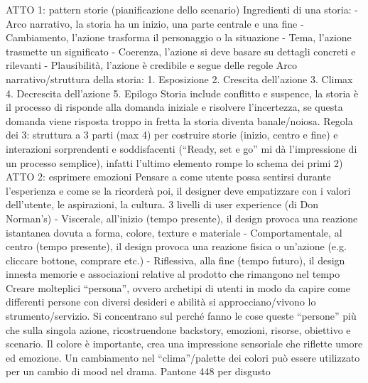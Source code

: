 ATTO 1: pattern storie (pianificazione dello scenario)
Ingredienti di una storia:
-	Arco narrativo, la storia ha un inizio, una parte centrale e una fine
-	Cambiamento, l'azione trasforma il personaggio o la situazione
-	Tema, l'azione trasmette un significato
-	Coerenza, l'azione si deve basare su dettagli concreti e rilevanti
-	Plausibilità, l'azione è credibile e segue delle regole 
Arco narrativo/struttura della storia:
1.	Esposizione
2.	Crescita dell'azione
3.	Climax
4.	Decrescita dell'azione
5.	Epilogo
Storia include conflitto e suspence, la storia è il processo di risponde alla domanda iniziale e risolvere l'incertezza, se questa domanda viene risposta troppo in fretta la storia diventa banale/noiosa. 
Regola dei 3: struttura a 3 parti (max 4) per costruire storie (inizio, centro e fine) e interazioni sorprendenti e soddisfacenti (“Ready, set e go” mi dà l'impressione di un processo semplice), infatti l'ultimo elemento rompe lo schema dei primi 2)
ATTO 2: esprimere emozioni
Pensare a come utente possa sentirsi durante l'esperienza e come se la ricorderà poi, il designer deve empatizzare con i valori dell'utente, le aspirazioni, la cultura.
3 livelli di user experience (di Don Norman's)
-	Viscerale, all'inizio (tempo presente), il design provoca una reazione istantanea dovuta a forma, colore, texture e materiale
-	Comportamentale, al centro (tempo presente), il design provoca una reazione fisica o un'azione (e.g. cliccare bottone, comprare etc.)
-	Riflessiva, alla fine (tempo futuro), il design innesta memorie e associazioni relative al prodotto che rimangono nel tempo
Creare molteplici “persona”, ovvero archetipi di utenti in modo da capire come differenti persone con diversi desideri e abilità si approcciano/vivono lo strumento/servizio. Si concentrano sul perché fanno le cose queste “persone” più che sulla singola azione, ricostruendone backstory, emozioni, risorse, obiettivo e scenario.
Il colore è importante, crea una impressione sensoriale che riflette umore ed emozione. Un cambiamento nel “clima”/palette dei colori può essere utilizzato per un cambio di mood nel drama. Pantone 448 per disgusto


